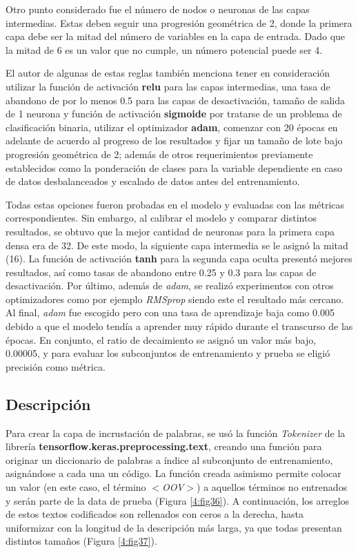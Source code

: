 Otro punto considerado fue el número de nodos o neuronas de las capas intermedias. Estas deben seguir una progresión geométrica de 2, donde la primera capa debe ser la mitad del número de variables en la capa de entrada. Dado que la mitad de 6 es un valor que no cumple, un número potencial puede ser 4.

El autor de algunas de estas reglas también menciona tener en consideración utilizar la función de activación \textbf{relu} para las capas intermedias, una tasa de abandono de por lo menos 0.5 para las capas de desactivación, tamaño de salida de 1 neurona y función de activación \textbf{sigmoide} por tratarse de un problema de clasificación binaria, utilizar el optimizador \textbf{adam}, comenzar con 20 épocas en adelante de acuerdo al progreso de los resultados y fijar un tamaño de lote bajo progresión geométrica de 2; además de otros requerimientos previamente establecidos como la ponderación de clases para la variable dependiente en caso de datos desbalanceados y escalado de datos antes del entrenamiento.

Todas estas opciones fueron probadas en el modelo y evaluadas con las métricas correspondientes. Sin embargo, al calibrar el modelo y comparar distintos resultados, se obtuvo que la mejor cantidad de neuronas para la primera capa densa era de 32. De este modo, la siguiente capa intermedia se le asignó la mitad (16). La función de activación \textbf{tanh} para la segunda capa oculta presentó mejores resultados, así como tasas de abandono entre 0.25 y 0.3 para las capas de desactivación. Por último, además de \textit{adam}, se realizó experimentos con otros optimizadores como por ejemplo \textit{RMSprop} siendo este el resultado más cercano. Al final, \textit{adam} fue escogido pero con una tasa de aprendizaje baja como 0.005 debido a que el modelo tendía a aprender muy rápido durante el transcurso de las épocas. En conjunto, el ratio de decaimiento se asignó un valor más bajo, 0.00005, y para evaluar los subconjuntos de entrenamiento y prueba se eligió precisión como métrica.

\subsection{Descripción}
Para crear la capa de incrustación de palabras, se usó la función \textit{Tokenizer} de la librería \textbf{tensorflow.keras.preprocessing.text}, creando una función para originar un diccionario de palabras a índice al subconjunto de entrenamiento, asignándose a cada una un código. La función creada asimismo permite colocar un valor (en este caso, el término \textit{$<$OOV$>$}) a aquellos términos no entrenados y serán parte de la data de prueba (Figura \ref{4:fig36}). A continuación, los arreglos de estos textos codificados son rellenados con ceros a la derecha, hasta uniformizar con la longitud de la descripción más larga, ya que todas presentan distintos tamaños (Figura \ref{4:fig37}).

